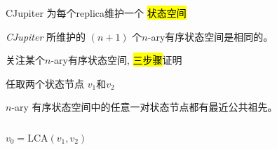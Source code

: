 \begin{frame}{}
  \begin{center}
    {\large CJupiter 为每个replica维护一个 \hl{ 状态空间}}
  \end{center}

  \begin{center}
    \resizebox{0.55\textwidth}{!}{}
  \end{center}
\end{frame}

\begin{frame}{}
  \begin{center}
    \begin{prop}
      {\large \emph{CJupiter} 所维护的 $(n+1)$ 个$n$-ary有序状态空间是相同的。}
    \end{prop}

    \resizebox{0.50\textwidth}{!}{}

  \end{center}
\end{frame}

\begin{frame}{}
  \centerline{}
\end{frame}

\begin{frame}{}
  \begin{center}
    {\large 关注某个$n$-ary有序状态空间, \hl{三步骤}证明}
  \end{center}


  \pause
  \begin{center}
  \end{center}
\end{frame}

\begin{frame}{}
  \centerline{ 任取两个状态节点 $v_1$和$v_2$}

  \begin{clemma}
    $n$-ary 有序状态空间中的任意一对状态节点都有最近公共祖先。
  \end{clemma}

  \begin{columns}
	\[
	  v_0 = \text{LCA}(v_1, v_2)
	\]
  \end{columns}
\end{frame}


